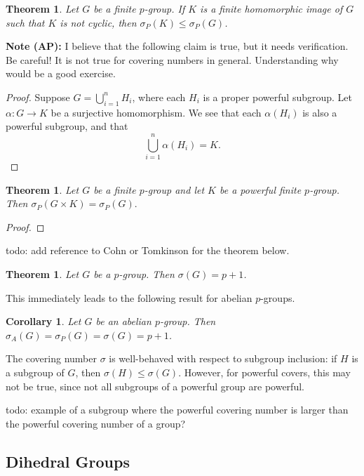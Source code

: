 \documentclass{amsart}
\numberwithin{equation} {section}
\newtheorem{theorem}[equation]{Theorem}
\newtheorem{corollary}[equation]{Corollary}
\theoremstyle{definition}
\begin{document}
\begin{theorem}
Let $G$ be a finite $p$-group. If $K$ is a finite homomorphic image of $G$ such that $K$ is not cyclic, then $\sigma_P(K) \leq \sigma_P(G)$.
\end{theorem}

\textbf{Note (AP):} I believe that the following claim is true, but it needs verification. Be careful! It is not true for covering numbers in general. Understanding why would be a good exercise. 

\begin{proof}
 Suppose $G = \bigcup_{i=1}^n H_i$, where each $H_i$ is a proper powerful subgroup. Let $\alpha: G \rightarrow K$ be a surjective homomorphism. We see that each $\alpha(H_i)$ is also a powerful subgroup, and that \[
 \bigcup_{i=1}^n \alpha\left(H_i\right) = K.
 \]
\end{proof}

\begin{theorem}
Let $G$ be a finite $p$-group and let $K$ be a powerful finite $p$-group. Then $\sigma_P(G \times K) = \sigma_P(G).$
\end{theorem}

\begin{proof}

\end{proof}

todo: add reference to Cohn or Tomkinson for the theorem below. 

\begin{theorem}\label{t:covering-number-doesnt-change-abelian} Let $G$ be a $p$-group. Then $\sigma(G) =  p + 1$.
\end{theorem}

This immediately leads to the following result for abelian $p$-groups. 

\begin{corollary}
Let $G$ be an abelian $p$-group. Then $\sigma_{A}(G) = \sigma_P(G) = \sigma(G) = p+1$.
\end{corollary}

The covering number $\sigma$ is well-behaved with respect to subgroup inclusion: if $H$ is a subgroup of $G$, then $\sigma(H) \leq \sigma(G)$. However, for powerful covers, this may not be true, since not all subgroups of a powerful group are powerful. 

todo: example of a subgroup where the powerful covering number is larger than the powerful covering number of a group? 

\subsection{Dihedral Groups}
\end{document}
